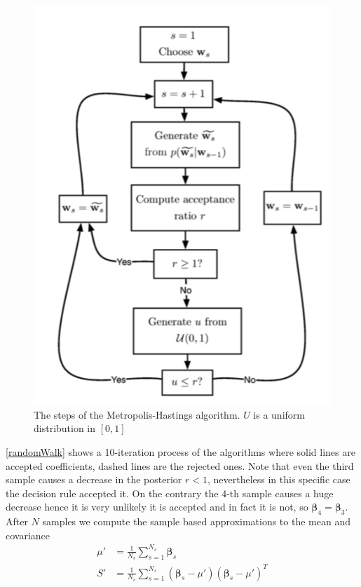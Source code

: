 \documentclass[12pt, letterpaper]{article}
\theoremstyle{definition}
\newcommand{\be}{\mathbf{\beta}}
\begin{document}
\begin{figure}
\centering
\includegraphics[scale=0.45]{img/MHAlgo}
\caption{The steps of the Metropolis-Hastings algorithm. $U$ is a uniform distribution in $[0,1]$}
\label{MHAlgo}
\end{figure}

\ref{randomWalk} shows a 10-iteration process of the algorithms where solid lines are accepted coefficients, dashed lines are the rejected ones. Note that even the third sample causes a decrease in the posterior $r<1$, nevertheless in this specific case the decision rule accepted it. On the contrary the 4-th sample causes a huge decrease hence it is very unlikely it is accepted and in fact it is not, so $\be_4 = \be_3$. After $N$ samples we compute the sample based approximations to the mean and covariance
\begin{equation}
\begin{aligned}
\mu' &= \frac{1}{N_s} \sum_{s=1}^{N_s} \be_s\\
S' &= \frac{1}{N_s} \sum_{s=1}^{N_s} (\be_s-\mu')(\be_s-\mu')^T
\end{aligned}
\end{equation}
\end{document}
